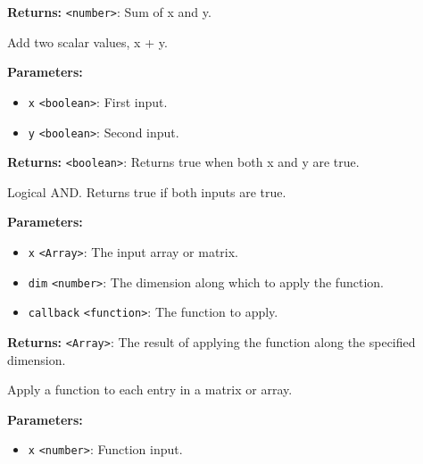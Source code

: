 \documentclass[12pt,a4paper]{article}
\begin{document}
\noindent \textbf{Returns:} \texttt{<number>}: Sum of \textasciigrave{}x\textasciigrave{} and \textasciigrave{}y\textasciigrave{}.

\noindent Add two scalar values, \textasciigrave{}x + y\textasciigrave{}.

\vspace{5mm}
\noindent {}


\noindent \textbf{Parameters:}
\begin{itemize}
  \item \texttt{x} \texttt{<boolean>}: First input.
  \item \texttt{y} \texttt{<boolean>}: Second input.
\end{itemize}

\noindent \textbf{Returns:} \texttt{<boolean>}: Returns true when both \textasciigrave{}x\textasciigrave{} and \textasciigrave{}y\textasciigrave{} are true.

\noindent Logical AND. Returns true if both inputs are true.

\vspace{5mm}
\noindent {}


\noindent \textbf{Parameters:}
\begin{itemize}
  \item \texttt{x} \texttt{<Array>}: The input array or matrix.
  \item \texttt{dim} \texttt{<number>}: The dimension along which to apply the function.
  \item \texttt{callback} \texttt{<function>}: The function to apply.
\end{itemize}

\noindent \textbf{Returns:} \texttt{<Array>}: The result of applying the function along the specified dimension.

\noindent Apply a function to each entry in a matrix or array.

\vspace{5mm}
\noindent {}


\noindent \textbf{Parameters:}
\begin{itemize}
  \item \texttt{x} \texttt{<number>}: Function input.
\end{itemize}
\end{document}

